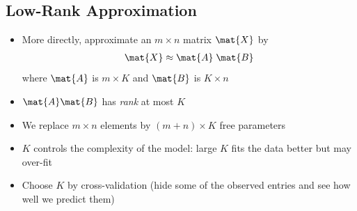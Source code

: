 \begin{slide}
\section{Low-Rank Approximation}

\begin{PauseHighLight}
  \begin{itemize}
  \item More directly, approximate an $m\times n$ matrix $\mat{X}$ by
    \begin{align*}
      \mat{X} \approx \mat{A}\; \mat{B}
    \end{align*}
    where $\mat{A}$ is $m \times K$ and $\mat{B}$ is
    $K\times n$\pause
  \item $\mat{A} \mat{B}$ has \textit{rank} at most $K$\pause
  \item We replace $m\times n$ elements by $(m+n)\times K$ free
    parameters\pause
  \item $K$ controls the complexity of the model: large $K$ fits the
    data better but may over-fit\pause
  \item Choose $K$ by cross-validation (hide some of the observed
    entries and see how well we predict them)\pause
  \end{itemize}
\end{PauseHighLight}

\end{slide}


